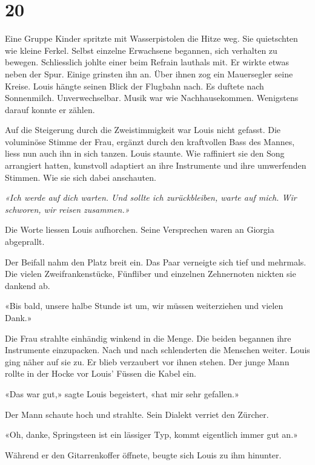  \chapter{20}

Eine Gruppe Kinder spritzte mit Wasserpistolen die Hitze weg. Sie quietschten wie kleine Ferkel. Selbst einzelne Erwachsene begannen, sich verhalten zu bewegen. 
Schliesslich johlte einer beim Refrain lauthals mit. Er wirkte etwas neben der Spur. Einige
grinsten ihn an. Über ihnen zog ein Mauersegler seine Kreise. Louis hängte seinen
Blick der Flugbahn nach. Es duftete nach Sonnenmilch. Unverwechselbar. Musik war wie Nachhausekommen. 
Wenigstens darauf konnte er zählen. 

Auf die Steigerung durch die Zweistimmigkeit war Louis nicht
gefasst. Die voluminöse Stimme der Frau, ergänzt durch den kraftvollen
Bass des Mannes, liess nun auch ihn in sich tanzen. Louis staunte. Wie
raffiniert sie den Song arrangiert hatten, kunstvoll adaptiert an ihre Instrumente
und ihre umwerfenden Stimmen. Wie sie sich dabei anschauten.

\sectionbreak 

\emph{«Ich werde auf dich warten. Und sollte ich zurückbleiben, warte auf 
mich. Wir schworen, wir reisen zusammen.»} 

\sectionbreak  

Die Worte liessen Louis aufhorchen. Seine Versprechen waren an Giorgia abgeprallt.

Der Beifall nahm den Platz breit ein. Das Paar
verneigte sich tief und mehrmals. Die vielen Zweifrankenstücke,
Fünfliber und einzelnen Zehnernoten nickten sie dankend ab.

«Bis bald, unsere halbe Stunde ist um, wir müssen weiterziehen und
vielen Dank.»

Die Frau strahlte einhändig winkend in die Menge. Die beiden begannen ihre Instrumente einzupacken. 
Nach und nach schlenderten die Menschen weiter. 
Louis ging näher auf sie zu. Er blieb verzaubert vor ihnen stehen.
Der junge Mann rollte in der Hocke vor Louis’ Füssen die Kabel ein.

«Das war gut,» sagte Louis begeistert, «hat mir sehr gefallen.»

Der Mann schaute hoch und strahlte. Sein Dialekt verriet den
Zürcher.

«Oh, danke, Springsteen ist ein lässiger Typ, kommt eigentlich immer gut
an.»

Während er den Gitarrenkoffer öffnete, beugte sich Louis zu ihm hinunter.

